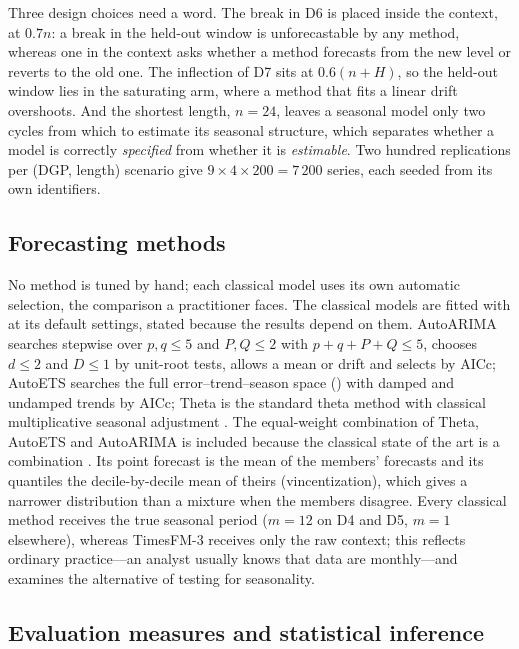 Three design choices need a word. The break in D6 is placed inside the context, at $0.7n$: a break in the
held-out window is unforecastable by any method, whereas one in the context asks whether a method
forecasts from the new level or reverts to the old one. The inflection of D7 sits at $0.6(n+H)$, so the
held-out window lies in the saturating arm, where a method that fits a linear drift overshoots. And the
shortest length, $n = 24$, leaves a seasonal model only two cycles from which to estimate its seasonal
structure, which separates whether a model is correctly \emph{specified} from whether it is
\emph{estimable}. Two hundred replications per (DGP, length) scenario give $9 \times 4 \times 200 = 7\,200$
series, each seeded from its own identifiers.

\subsection{Forecasting methods}
\label{sec:methods}

No method is tuned by hand; each classical model uses its own automatic selection, the comparison a
practitioner faces. The classical models are fitted with  \citep{statsforecast} at its
default settings, stated because the results depend on them. AutoARIMA searches stepwise over $p, q \le 5$
and $P, Q \le 2$ with $p + q + P + Q \le 5$, chooses $d \le 2$ and $D \le 1$ by unit-root tests, allows a
mean or drift and selects by AICc; AutoETS searches the full error--trend--season space () with
damped and undamped trends by AICc; Theta is the standard theta method with classical multiplicative
seasonal adjustment \citep{hyndman2021fpp}. The equal-weight combination of Theta, AutoETS and AutoARIMA
is included because the classical state of the art is a combination \citep{makridakis2020m4,
petropoulos2022theory}. Its point forecast is the mean of the members' forecasts and its quantiles the
decile-by-decile mean of theirs (vincentization), which gives a narrower distribution than a mixture when
the members disagree. Every classical method receives the true seasonal period ($m = 12$ on D4 and D5,
$m = 1$ elsewhere), whereas TimesFM-3 receives only the raw context; this reflects ordinary practice---an
analyst usually knows that data are monthly---and  examines the alternative of
testing for seasonality.

\subsection{Evaluation measures and statistical inference}
\label{sec:evaluation}

